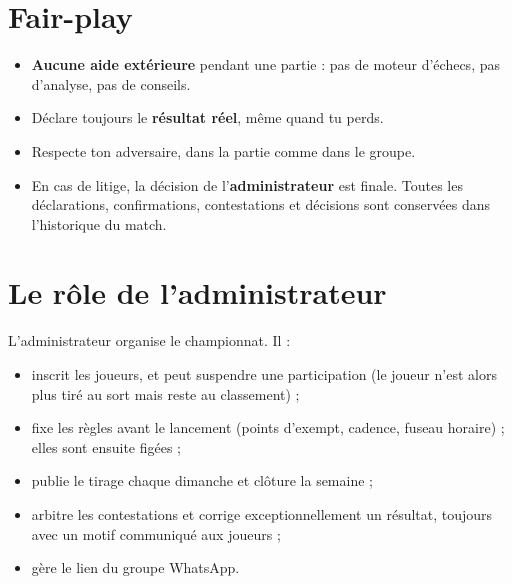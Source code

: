 \documentclass[11pt,a4paper]{article}
\begin{document}
\section{Fair-play}
\begin{itemize}
  \item \textbf{Aucune aide extérieure} pendant une partie : pas de moteur d'échecs, pas d'analyse, pas de conseils.
  \item Déclare toujours le \textbf{résultat réel}, même quand tu perds.
  \item Respecte ton adversaire, dans la partie comme dans le groupe.
  \item En cas de litige, la décision de l'\textbf{administrateur} est finale. Toutes les déclarations, confirmations,
        contestations et décisions sont conservées dans l'historique du match.
\end{itemize}

\section{Le rôle de l'administrateur}
L'administrateur organise le championnat. Il :
\begin{itemize}
  \item inscrit les joueurs, et peut suspendre une participation (le joueur n'est alors plus tiré au sort mais reste au classement) ;
  \item fixe les règles avant le lancement (points d'exempt, cadence, fuseau horaire) ; elles sont ensuite figées ;
  \item publie le tirage chaque dimanche et clôture la semaine ;
  \item arbitre les contestations et corrige exceptionnellement un résultat, toujours avec un motif communiqué aux joueurs ;
  \item gère le lien du groupe WhatsApp.
\end{itemize}

\end{document}
